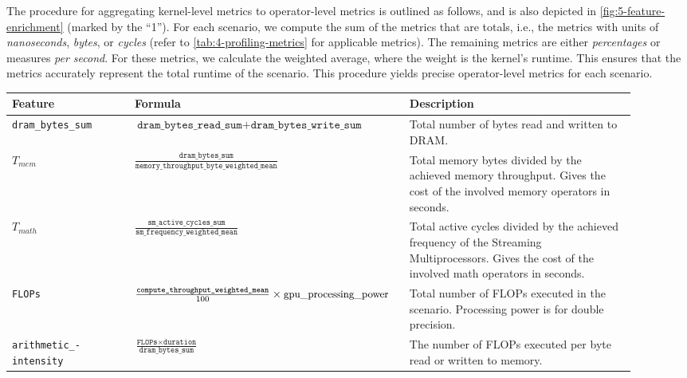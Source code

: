 The procedure for aggregating kernel-level metrics to operator-level metrics is outlined as follows, and is also depicted in \autoref{fig:5-feature-enrichment} (marked by the “1”). For each scenario, we compute the sum of the metrics that are totals, i.e., the metrics with units of \textit{nanoseconds}, \textit{bytes}, or \textit{cycles} (refer to \autoref{tab:4-profiling-metrics} for applicable metrics). The remaining metrics are either \textit{percentages} or measures \textit{per second}. For these metrics, we calculate the weighted average, where the weight is the kernel’s runtime. This ensures that the metrics accurately represent the total runtime of the scenario. This procedure yields precise operator-level metrics for each scenario.

\begin{table}[ht]
  \centering
  \begin{tabular}{p{0.19\linewidth}p{0.37\linewidth}>{\footnotesize}p{0.35\linewidth}}
    \toprule
    Feature                                   & Formula                                                                                                 & Description                                                                                                                                       \\
    \midrule\midrule
    \texttt{dram\_bytes\_sum}                 & $\texttt{dram\_bytes\_read\_sum} + \texttt{dram\_bytes\_write\_sum}$                                    & Total number of bytes read and written to DRAM.                                                                                                   \\
    $T_{mem}$                                 & $\frac{\texttt{dram\_bytes\_sum}}{\texttt{memory\_throughput\_byte\_weighted\_mean}}$                   & Total memory bytes divided by the achieved memory throughput. Gives the cost of the involved memory operators in seconds.                         \\
    $T_{math}$                                & $\frac{\texttt{sm\_active\_cycles\_sum}}{\texttt{sm\_frequency\_weighted\_mean}}$                       & Total active cycles divided by the achieved frequency of the Streaming Multiprocessors. Gives the cost of the involved math operators in seconds. \\
    \texttt{FLOPs}                            & $\frac{\texttt{compute\_throughput\_weighted\_mean}}{100} \times \text{\small{gpu\_processing\_power}}$ & Total number of FLOPs executed in the scenario. Processing power is for double precision.                                                         \\
    \texttt{arithmetic\_-} \texttt{intensity} & $\frac{\texttt{FLOPs} \times \texttt{duration}}{\texttt{dram\_bytes\_sum}}$                             & The number of FLOPs executed per byte read or written to memory.                                                                                  \\


\end{tabular}
\end{table}
